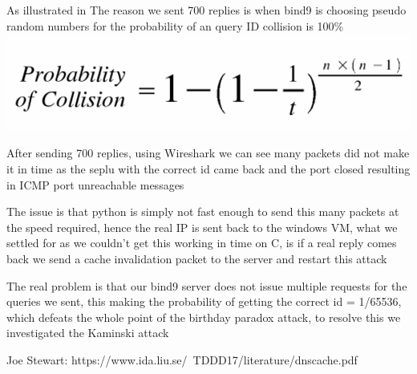\documentclass[11pt]{report}
\begin{document}
As illustrated in \cite{bday} The reason we sent 700 replies is when bind9 is choosing pseudo random numbers for the probability of an query ID collision is 100\% \\[0.5em]
\includegraphics[width=17cm]{Figures/bp.png}
   
After sending 700 replies, using Wireshark we can see many packets did not make it in time as the seplu with the correct id came back and the port closed resulting in ICMP port unreachable messages 
  
The issue is that python is simply not fast enough to send this many packets at the speed required, hence the real IP is sent back to the windows VM, what we settled for as we couldn't get this working in time on C, is if a real reply comes back we send a cache invalidation packet to the server and restart this attack 
  
The real problem is that our bind9 server does not issue multiple requests for the queries we sent, this making the probability of getting the correct id = 1/65536, which defeats the whole point of the birthday paradox attack, to resolve this we investigated the Kaminski attack 

\begin{thebibliography}{9}
  Joe Stewart: https://www.ida.liu.se/~TDDD17/literature/dnscache.pdf

\end{thebibliography}
\end{document}
